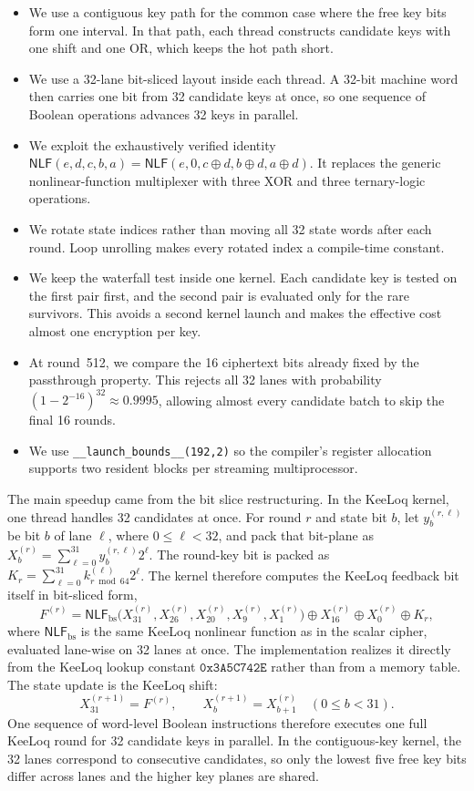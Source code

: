 \documentclass[version=preprint]{iacrcc}
\providecommand{\NLF}{\mathsf{NLF}}
\begin{document}
\begin{itemize}
  \item We use a contiguous key path for the common case where the free key bits form one interval.
  In that path, each thread constructs candidate keys with one shift and one OR, which keeps the hot path short.
  \item We use a 32-lane bit-sliced layout inside each thread.
  A 32-bit machine word then carries one bit from 32 candidate keys at once, so one sequence of Boolean operations advances 32 keys in parallel.
  \item We exploit the exhaustively verified identity
  $\NLF(e,d,c,b,a)=\NLF(e,0,c\oplus d,b\oplus d,a\oplus d)$.
  It replaces the generic nonlinear-function multiplexer with three XOR and three ternary-logic operations.
  \item We rotate state indices rather than moving all 32 state words after each round.
  Loop unrolling makes every rotated index a compile-time constant.
  \item We keep the waterfall test inside one kernel.
  Each candidate key is tested on the first pair first, and the second pair is evaluated only for the rare survivors.
  This avoids a second kernel launch and makes the effective cost almost one encryption per key.
  \item At round~512, we compare the 16 ciphertext bits already fixed by the passthrough property.
  This rejects all 32 lanes with probability $(1-2^{-16})^{32}\approx0.9995$, allowing almost every candidate batch to skip the final 16 rounds.
  \item We use \texttt{\_\_launch\_bounds\_\_(192,2)} so the compiler's register allocation supports two resident blocks per streaming multiprocessor.
\end{itemize}

The main speedup came from the bit slice restructuring.
In the KeeLoq kernel, one thread handles 32 candidates at once.
For round $r$ and state bit $b$, let $y^{(r,\ell)}_b$ be bit $b$ of lane $\ell$, where $0 \leq \ell < 32$, and pack that bit-plane as $X_b^{(r)} = \sum_{\ell=0}^{31} y_b^{(r,\ell)} 2^\ell$.
The round-key bit is packed as $K_r = \sum_{\ell=0}^{31} k_{r \bmod 64}^{(\ell)} 2^\ell$.
The kernel therefore computes the KeeLoq feedback bit itself in bit-sliced form,
\[
F^{(r)} = \NLF_{\mathrm{bs}}\!\bigl(X_{31}^{(r)}, X_{26}^{(r)}, X_{20}^{(r)}, X_9^{(r)}, X_1^{(r)}\bigr)
\oplus X_{16}^{(r)} \oplus X_0^{(r)} \oplus K_r,
\]
where $\NLF_{\mathrm{bs}}$ is the same KeeLoq nonlinear function as in the scalar cipher, evaluated lane-wise on 32 lanes at once.
The implementation realizes it directly from the KeeLoq lookup constant $\mathtt{0x3A5C742E}$ rather than from a memory table.
The state update is the KeeLoq shift:
\[
X_{31}^{(r+1)} = F^{(r)},
\qquad
X_b^{(r+1)} = X_{b+1}^{(r)} \quad (0 \leq b < 31).
\]
One sequence of word-level Boolean instructions therefore executes one full KeeLoq round for 32 candidate keys in parallel.
In the contiguous-key kernel, the 32 lanes correspond to consecutive candidates, so only the lowest five free key bits differ across lanes and the higher key planes are shared.
\end{document}
